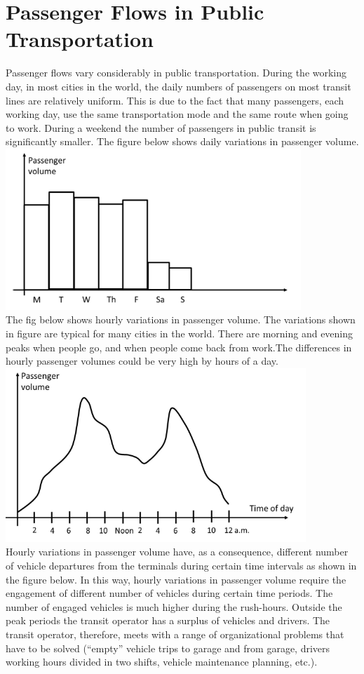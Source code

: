 \section{Passenger Flows in Public Transportation}
Passenger flows vary considerably in public transportation. During the working day, in most cities in the world, the daily numbers of passengers on most transit lines are relatively uniform. This is due to the fact that many passengers, each working day, use the same transportation mode and the same route when going to work. During a weekend the number of passengers in public transit is significantly smaller. The figure below shows daily variations in passenger volume.\\
\includegraphics[scale=0.7]{gfx/fig18.png}\\
The fig below shows hourly variations in passenger volume. The variations shown in figure are typical for many cities in the world. There are morning and evening peaks when people go, and when people come back from work.The differences in hourly passenger volumes could be very high by hours of a day.\\
\includegraphics[scale=0.7]{gfx/fig19.png}\\
Hourly variations in passenger volume have, as a consequence, different number of vehicle departures from the terminals during certain time intervals as shown in the figure below. In this way, hourly variations in passenger volume require the engagement of different number of vehicles during certain time periods. The number of engaged vehicles is much higher during the rush-hours. Outside the peak periods the transit operator has a surplus of vehicles and drivers. The transit operator, therefore, meets with a range of organizational problems that have to be solved (“empty” vehicle trips to garage and from garage, drivers working hours divided in two shifts, vehicle maintenance planning, etc.).\\

